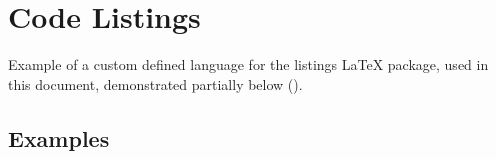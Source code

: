 
\section{Code Listings}

Example of a custom defined language for the listings \LaTeX{} package,
used in this document, demonstrated partially below ().




\subsection{Examples\label{sub:Code Listings - Example}}


